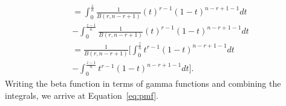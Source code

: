 \documentclass[12pt]{article}
\theoremstyle{plain}
\begin{document}
\begin{appendix}
\begin{align*}
	&= \int_0^{\frac{z}{n}} \frac{1}{B(r, n - r + 1)} \left(t\right)^{r-1}\left(1-t\right)^{n-r + 1 - 1} dt \\
	& - \int_0^{\frac{z-1}{n}} \frac{1}{B(r, n - r + 1)} \left(t\right)^{r-1}\left(1-t\right)^{n-r + 1 - 1} dt\\
	&=  \frac{1}{B(r, n - r + 1)} \bigg[ \int_0^{\frac{z}{n}} t^{r-1}\left(1-t\right)^{n-r + 1 - 1} dt \\
	&- \int_0^{\frac{z-1}{n}}t^{r-1}\left(1-t\right)^{n-r + 1 - 1} dt \bigg].
\end{align*}
	Writing the beta function in terms of gamma functions and combining the integrals, we arrive at Equation~\eqref{eq:pmf}.



\end{appendix}
\end{document}
